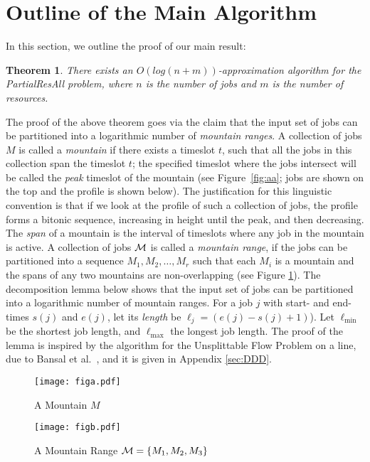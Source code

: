 \documentclass[11pt]{article}
\newtheorem{theorem}{Theorem}
\newcommand{\PResAll}{{\sc PartialResAll}}
\newcommand{\calM} {{\cal M}}
\begin{document}
\section{Outline of the Main Algorithm}
\label{sec:overview}
In this section, we outline the proof of our main result:

\begin{theorem}
\label{thm:xAAA}
There exists an $O(log (n+m))$-approximation algorithm for the {\PResAll} problem,
where $n$ is the number of jobs and $m$ is the number of resources.
\end{theorem}

The proof of the above theorem goes via the claim that the input set of jobs can be 
partitioned into a logarithmic number of {\em mountain ranges}. 
A collection of jobs $M$ is called a {\em mountain} if there exists a timeslot $t$, such that
all the jobs in this collection span the timeslot $t$; the specified timeslot where the jobs 
intersect will be called the {\em peak} timeslot of the mountain (see Figure~\ref{fig:aa};
jobs are shown on the top and the profile is shown below).
The justification for this linguistic convention is that if we look at the profile of such a 
collection of jobs, the profile forms a bitonic sequence, increasing in height until the peak, and 
then decreasing. 
The {\em span} of a mountain is the interval of timeslots where any job in the mountain is active.  
A collection of jobs $\calM$ is called a {\em mountain range}, if the jobs can be partitioned into 
a sequence $M_1, M_2, \ldots, M_r$ such that each $M_i$ is a mountain and the spans of any two mountains 
are non-overlapping (see Figure \ref{fig:bb}).
The decomposition lemma below shows that the input set of jobs can be partitioned into a logarithmic number
of mountain ranges.  For a job $j$ with 
start- and end-times $s(j)$ and $e(j)$, let its {\em length} be $\ell_j = (e(j) - s(j) +1)$). 
Let  $\ell_{\min}$ be the shortest job length, and $\ell_{\max}$ the longest job length. 
The proof of the lemma is inspired by the algorithm for the Unsplittable Flow Problem on 
a line, due to Bansal et al.~\cite{BansalFKS09}, and it is given in Appendix \ref{sec:DDD}.

\begin{figure}[t!]
\begin{minipage}{0.4\linewidth}
\centering
\texttt{[image: figa.pdf]}
\caption{
A Mountain $M$
}
\label{fig:aa}
\end{minipage}
\centering
\begin{minipage}{0.55\linewidth}
\texttt{[image: figb.pdf]}
\caption{
A Mountain Range ${\cal M}=\{M_1, M_2, M_3\}$
}
\label{fig:bb}
\end{minipage}
\end{figure}
\end{document}
